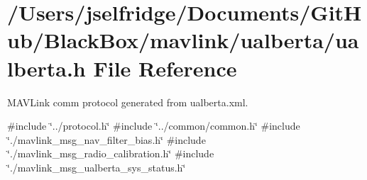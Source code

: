 \section{/\+Users/jselfridge/\+Documents/\+Git\+Hub/\+Black\+Box/mavlink/ualberta/ualberta.h File Reference}
\label{ualberta_8h}


M\+A\+V\+Link comm protocol generated from ualberta.\+xml.  


{\ttfamily \#include \char`\"{}../protocol.\+h\char`\"{}}\newline
{\ttfamily \#include \char`\"{}../common/common.\+h\char`\"{}}\newline
{\ttfamily \#include \char`\"{}./mavlink\+\_\+msg\+\_\+nav\+\_\+filter\+\_\+bias.\+h\char`\"{}}\newline
{\ttfamily \#include \char`\"{}./mavlink\+\_\+msg\+\_\+radio\+\_\+calibration.\+h\char`\"{}}\newline
{\ttfamily \#include \char`\"{}./mavlink\+\_\+msg\+\_\+ualberta\+\_\+sys\+\_\+status.\+h\char`\"{}}\newline
